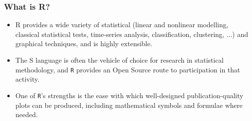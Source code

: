 \documentclass{beamer}
\begin{document}
 	\begin{frame}
 		\frametitle{What is R?}
 		\begin{itemize}
 			\item R provides a wide variety of statistical (linear and nonlinear modelling, classical statistical tests,
 			time-series analysis, classification, clustering, ...) and graphical techniques, and is highly extensible.
 			\item The S language is often the vehicle of choice for research in statistical methodology,
 			and \texttt{R} provides an Open Source route to participation in that activity.
 			\item One of \texttt{R}’s strengths is the ease with which well-designed publication-quality plots can be
 			produced, including mathematical symbols and formulae where needed. 
 			\end{itemize}
 			
 		\end{frame}
 		
\end{document}
